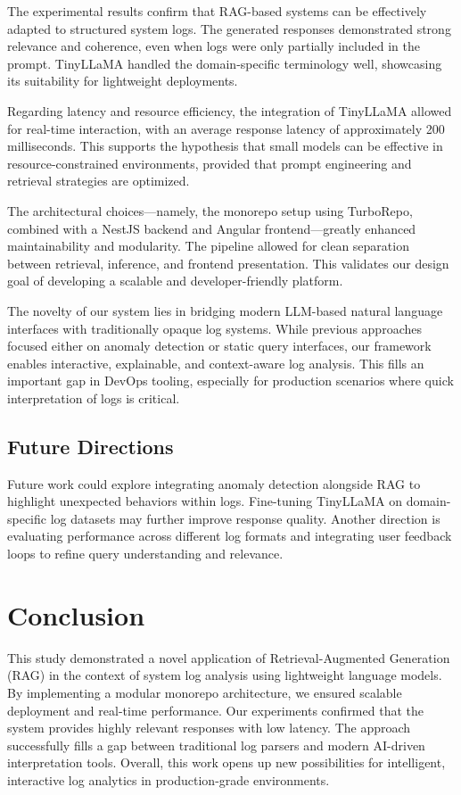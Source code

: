 \documentclass[conference]{IEEEtran}
\begin{document}
The experimental results confirm that RAG-based systems can be effectively adapted to structured system logs. The generated responses demonstrated strong relevance and coherence, even when logs were only partially included in the prompt. TinyLLaMA handled the domain-specific terminology well, showcasing its suitability for lightweight deployments.

Regarding latency and resource efficiency, the integration of TinyLLaMA allowed for real-time interaction, with an average response latency of approximately 200 milliseconds. This supports the hypothesis that small models can be effective in resource-constrained environments, provided that prompt engineering and retrieval strategies are optimized.

The architectural choices—namely, the monorepo setup using TurboRepo, combined with a NestJS backend and Angular frontend—greatly enhanced maintainability and modularity. The pipeline allowed for clean separation between retrieval, inference, and frontend presentation. This validates our design goal of developing a scalable and developer-friendly platform.

The novelty of our system lies in bridging modern LLM-based natural language interfaces with traditionally opaque log systems. While previous approaches focused either on anomaly detection or static query interfaces, our framework enables interactive, explainable, and context-aware log analysis. This fills an important gap in DevOps tooling, especially for production scenarios where quick interpretation of logs is critical.

\subsection{Future Directions}

Future work could explore integrating anomaly detection alongside RAG to highlight unexpected behaviors within logs. Fine-tuning TinyLLaMA on domain-specific log datasets may further improve response quality. Another direction is evaluating performance across different log formats and integrating user feedback loops to refine query understanding and relevance.

\section{Conclusion}

This study demonstrated a novel application of Retrieval-Augmented Generation (RAG) in the context of system log analysis using lightweight language models. By implementing a modular monorepo architecture, we ensured scalable deployment and real-time performance. Our experiments confirmed that the system provides highly relevant responses with low latency. The approach successfully fills a gap between traditional log parsers and modern AI-driven interpretation tools. Overall, this work opens up new possibilities for intelligent, interactive log analytics in production-grade environments.





\end{document}
